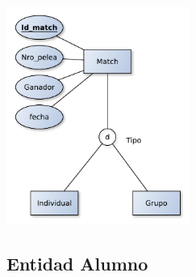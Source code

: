 \begin{center}
\includegraphics[width=6cm,keepaspectratio]{./imagenes/des2.pdf}\newline
\end{center}

\subsection{Entidad Alumno}


